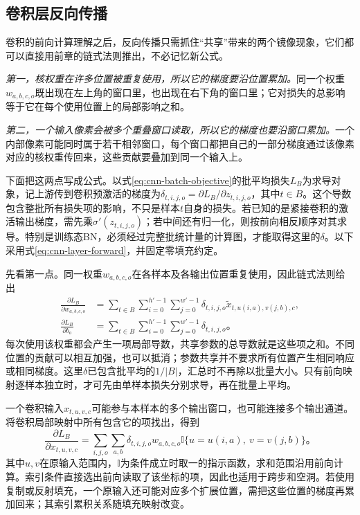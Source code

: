 \subsection{卷积层反向传播}
\label{sec:cnn-backpropagation}

卷积的前向计算理解之后，反向传播只需抓住“共享”带来的两个镜像现象，它们都可以直接用前章的链式法则推出，不必记忆新公式。

\emph{第一，核权重在许多位置被重复使用，所以它的梯度要沿位置累加。}同一个权重$w_{a,b,c,o}$既出现在左上角的窗口里，也出现在右下角的窗口里；它对损失的总影响等于它在每个使用位置上的局部影响之和。

\emph{第二，一个输入像素会被多个重叠窗口读取，所以它的梯度也要沿窗口累加。}一个内部像素可能同时属于若干相邻窗口，每个窗口都把自己的一部分梯度通过该像素对应的核权重传回来，这些贡献要叠加到同一个输入上。

下面把这两点写成公式。以式\eqref{eq:cnn-batch-objective}的批平均损失$L_B$为求导对象，记上游传到卷积预激活的梯度为$\delta_{t,i,j,o}=\partial L_B/\partial z_{t,i,j,o}$，其中$t\in B$。这个导数包含整批所有损失项的影响，不只是样本$t$自身的损失。若已知的是紧接卷积的激活输出梯度，需先乘$\sigma'(z_{t,i,j,o})$；若中间还有归一化，则按前向相反顺序对其求导。特别是训练态BN，必须经过完整批统计量的计算图，才能取得这里的$\delta$。以下采用式\eqref{eq:cnn-layer-forward}，并固定零填充约定。

先看第一点。同一权重$w_{a,b,c,o}$在各样本及各输出位置重复使用，因此链式法则给出
\begin{equation}
  \begin{aligned}
    \frac{\partial L_B}{\partial w_{a,b,c,o}}
      &=\sum_{t\in B}\sum_{i=0}^{h'-1}\sum_{j=0}^{w'-1}
         \delta_{t,i,j,o}\widetilde x_{t,u(i,a),v(j,b),c},\\
    \frac{\partial L_B}{\partial b_o}
      &=\sum_{t\in B}\sum_{i=0}^{h'-1}\sum_{j=0}^{w'-1}
         \delta_{t,i,j,o}\text{。}
  \end{aligned}
  \label{eq:cnn-parameter-gradients}
\end{equation}
每次使用该权重都会产生一项局部导数，共享参数的总导数就是这些项之和。不同位置的贡献可以相互加强，也可以抵消；参数共享并不要求所有位置产生相同响应或相同梯度。这里$\delta$已包含批平均的$1/|B|$，汇总时不再除以批量大小。只有前向映射逐样本独立时，才可先由单样本损失分别求导，再在批量上平均。

一个卷积输入$x_{t,u,v,c}$可能参与本样本的多个输出窗口，也可能连接多个输出通道。将卷积局部映射中所有包含它的项找出，得到
\begin{equation}
  \frac{\partial L_B}{\partial x_{t,u,v,c}}
  =\sum_{i,j,o}\sum_{a,b}
    \delta_{t,i,j,o}w_{a,b,c,o}
    \mathbb I\{u=u(i,a),\ v=v(j,b)\}\text{。}
  \label{eq:cnn-input-gradient}
\end{equation}
其中$u,v$在原输入范围内，$\mathbb I$为条件成立时取一的指示函数，求和范围沿用前向计算。索引条件直接选出前向读取了该坐标的项，因此也适用于跨步和空洞。若使用复制或反射填充，一个原输入还可能对应多个扩展位置，需把这些位置的梯度再累加回来；其索引累积关系随填充映射改变。

